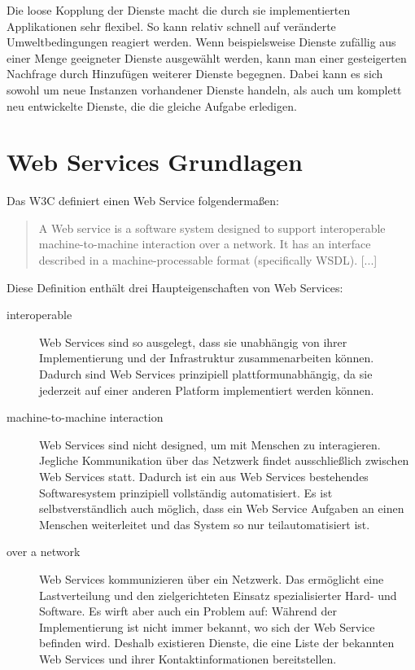 \documentclass[runningheads]{llncs}
\newcommand{\germanquote}[1]{\glqq{}#1\grqq{}}
\begin{document}
    Die loose Kopplung der Dienste macht die durch sie implementierten Applikationen sehr flexibel.
    So kann relativ schnell auf veränderte Umweltbedingungen reagiert werden. Wenn beispielsweise
    Dienste zufällig aus einer Menge geeigneter Dienste ausgewählt werden, kann man einer
    gesteigerten Nachfrage durch Hinzufügen weiterer Dienste begegnen. Dabei kann es sich sowohl um
    neue Instanzen vorhandener Dienste handeln, als auch um komplett neu entwickelte Dienste, die
    die gleiche Aufgabe erledigen.


  \label{ws}
  \section{Web Services Grundlagen}
  \nocite{wk_ws}
    Das W3C definiert einen \germanquote{Web Service} folgendermaßen:
    \begin{quote}
      A Web service is a software system designed to support interoperable machine-to-machine interaction
      over a network. It has an interface described in a machine-processable format (specifically
      WSDL). [...]\cite{w3c_wsgloss_ws}
    \end{quote}

    Diese Definition enthält drei Haupteigenschaften von Web Services:
    \begin{description}
      \item[interoperable]
        Web Services sind so ausgelegt, dass sie unabhängig von ihrer Implementierung und der
        Infrastruktur zusammenarbeiten können. Dadurch sind Web Services prinzipiell
        plattformunabhängig, da sie jederzeit auf einer anderen Platform implementiert werden
        können.
      \item[machine-to-machine interaction]
        Web Services sind nicht designed, um mit Menschen zu interagieren. Jegliche Kommunikation
        über das Netzwerk findet ausschließlich zwischen Web Services statt. Dadurch ist ein aus
        Web Services bestehendes Softwaresystem prinzipiell vollständig automatisiert. Es ist
        selbstverständlich auch möglich, dass ein Web Service Aufgaben an einen Menschen
        weiterleitet und das System so nur teilautomatisiert ist.
      \item[over a network]
        Web Services kommunizieren über ein Netzwerk. Das ermöglicht eine Lastverteilung und den
        zielgerichteten Einsatz spezialisierter Hard- und Software. Es wirft aber auch ein Problem
        auf: Während der Implementierung ist nicht immer bekannt, wo sich der Web Service befinden
        wird. Deshalb existieren Dienste, die eine Liste der bekannten Web Services und ihrer
        Kontaktinformationen bereitstellen.
    \end{description}
\end{document}
